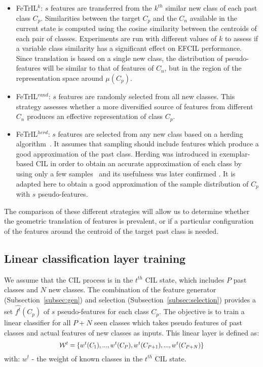 \documentclass[10pt,twocolumn,letterpaper]{article}
\newcommand{\ourmodelNospace}{FeTrIL}
\newcommand\scalemath[2]{\scalebox{#1}{\mbox{\ensuremath{\displaystyle #2}}}}
\begin{document}
\begin{itemize}[nosep,leftmargin=*]
    \item \ourmodelNospace$^k$: $s$ features are transferred from the $k^{th}$ similar new class of each past class $C_p$. Similarities between the target $C_p$ and the $C_n$ available in the current state is computed using the cosine similarity between the centroids of each pair of classes.  Experiments are run with different values of $k$ to assess if a variable class similarity has a significant effect on EFCIL performance. Since translation is based on a single new class, the distribution of pseudo-features will be similar to that of features of $C_n$, but in the region of the representation space around $\mu(C_p)$. 
    \item \ourmodelNospace$^{rand}$: $s$ features are randomly selected from all new classes. This strategy assesses whether a more diversified source of features from different $C_n$ produces an effective representation of class $C_p$. 
    \item \ourmodelNospace$^{herd}$: $s$ features are selected from any new class based on a herding algorithm~\cite{max2009_herding}. It assumes that sampling should include features which produce a good approximation of the past class. Herding was introduced in exemplar-based CIL in order to obtain an accurate approximation of each class by using only a few samples~\cite{rebuffi2017_icarl} and its usefulness was later confirmed \cite{belouadah2021_study,hou2019_lucir,wu2019_bic}. It is adapted here to obtain a good approximation of the sample distribution of $C_p$ with $s$ pseudo-features.
\end{itemize}

The comparison of these different strategies will allow us to determine whether the geometric translation of features is prevalent, or if a particular configuration of the features around the centroid of the target past class is needed. 

\subsection{Linear classification layer training}
\label{subsec:layer}
We assume that the CIL process is in the $t^{th}$ CIL state, which includes $P$ past classes and $N$ new classes.
The combination of the feature generator (Subsection~\ref{subsec:gen}) and selection (Subsection~\ref{subsec:selection}) provides a set ${\hat{f^t}}(C_p)$ of $s$ pseudo-features for each class $C_p$. 
The objective is to train a linear classifier for all $P+N$ seen classes which takes pseudo features of past classes and actual features of new classes as inputs.
This linear layer is defined as:
\begin{equation}
\scalemath{0.9}{
    \mathcal{W}^t = \{w^t(C_1),..., w^t(C_P), w^t(C_{P+1}),..., w^t(C_{P+N})\}
}
    \label{eq:linear}
\end{equation}
with: $w^t$ - the weight of known classes in the $t^{th}$ CIL state. 
\end{document}
